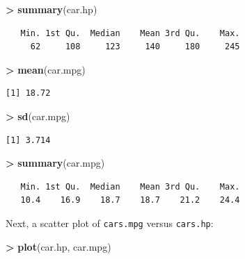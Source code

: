 \documentclass[]{krantz}
\makeatletter
\newenvironment{Shaded}{\begin{snugshade}}{\end{snugshade}}
\newcommand{\KeywordTok}[1]{\textcolor[rgb]{0.27,0.27,0.27}{\textbf{#1}}}
\newcommand{\NormalTok}[1]{#1}
\newcommand{\OperatorTok}[1]{\textcolor[rgb]{0.43,0.43,0.43}{\textbf{#1}}}
\newcommand{\StringTok}[1]{\textcolor[rgb]{0.5,0.5,0.5}{#1}}
\newenvironment{kframe}{%
\medskip{}
\setlength{\fboxsep}{.8em}
 \def\at@end@of@kframe{}%
 \ifinner\ifhmode%
  \def\at@end@of@kframe{\end{minipage}}%
  \begin{minipage}{\columnwidth}%
 \fi\fi%
 \def\FrameCommand##1{\hskip\@totalleftmargin \hskip-\fboxsep
 \colorbox{shadecolor}{##1}\hskip-\fboxsep
     \hskip-\linewidth \hskip-\@totalleftmargin \hskip\columnwidth}%
 \MakeFramed {\advance\hsize-\width
   \@totalleftmargin\z@ \linewidth\hsize
   \@setminipage}}%
 {\par\unskip\endMakeFramed%
 \at@end@of@kframe}
\renewenvironment{Shaded}{\begin{kframe}}{\end{kframe}}
\makeatother
\begin{document}
\begin{Shaded}
\begin{Highlighting}[]
\OperatorTok{>}\StringTok{ }\KeywordTok{summary}\NormalTok{(car.hp)}
\end{Highlighting}
\end{Shaded}

\begin{verbatim}
   Min. 1st Qu.  Median    Mean 3rd Qu.    Max. 
     62     108     123     140     180     245 
\end{verbatim}

\begin{Shaded}
\begin{Highlighting}[]
\OperatorTok{>}\StringTok{ }\KeywordTok{mean}\NormalTok{(car.mpg)}
\end{Highlighting}
\end{Shaded}

\begin{verbatim}
[1] 18.72
\end{verbatim}

\begin{Shaded}
\begin{Highlighting}[]
\OperatorTok{>}\StringTok{ }\KeywordTok{sd}\NormalTok{(car.mpg)}
\end{Highlighting}
\end{Shaded}

\begin{verbatim}
[1] 3.714
\end{verbatim}

\begin{Shaded}
\begin{Highlighting}[]
\OperatorTok{>}\StringTok{ }\KeywordTok{summary}\NormalTok{(car.mpg)}
\end{Highlighting}
\end{Shaded}

\begin{verbatim}
   Min. 1st Qu.  Median    Mean 3rd Qu.    Max. 
   10.4    16.9    18.7    18.7    21.2    24.4 
\end{verbatim}

Next, a scatter plot of \texttt{cars.mpg} versus \texttt{cars.hp}:

\begin{Shaded}
\begin{Highlighting}[]
\OperatorTok{>}\StringTok{ }\KeywordTok{plot}\NormalTok{(car.hp, car.mpg)}
\end{Highlighting}
\end{Shaded}
\end{document}
